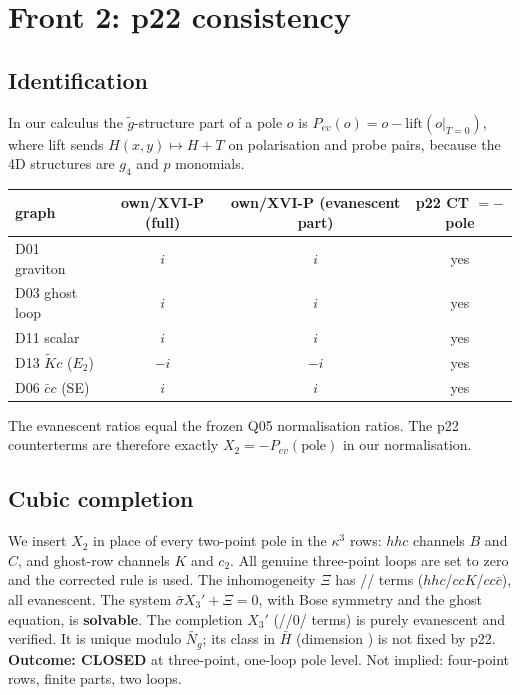 \documentclass[11pt]{article}
\begin{document}
\section{Front 2: p22 consistency}
\subsection{Identification}
In our calculus the $\tilde g$-structure part of a pole $o$ is $P_{ev}(o)=o-\mathrm{lift}(o|_{T=0})$, where lift sends
$H(x,y)\mapsto H+T$ on polarisation and probe pairs, because the 4D structures are $g_4$ and $p$ monomials.
\begin{center}\begin{tabular}{lccc}\toprule
graph & own/XVI-P (full) & own/XVI-P (evanescent part) & p22 CT $=-$pole\\\midrule
D01 graviton & $i$ & $i$ & yes\\
D03 ghost loop & $i$ & $i$ & yes\\
D11 scalar & $i$ & $i$ & yes\\
D13 $\tilde K c$ ($E_2$) & $-i$ & $-i$ & yes\\
D06 $\bar cc$ (SE) & $i$ & $i$ & yes\\\bottomrule\end{tabular}\end{center}
The evanescent ratios equal the frozen Q05 normalisation ratios. The p22 counterterms are therefore exactly
$X_2=-P_{ev}(\text{pole})$ in our normalisation.

\subsection{Cubic completion}
We insert $X_2$ in place of every two-point pole in the $\kappa^3$ rows: $hhc$ channels $B$ and $C$, and ghost-row
channels $K$ and $c_2$. All genuine three-point loops are set to zero and the corrected rule is used. The inhomogeneity
$\Xi$ has \XIh/\XIk/\XIb{} terms ($hhc$/$ccK$/$cc\bar c$), all evanescent. The system $\bar\sigma X_3'+\Xi=0$, with
Bose symmetry and the ghost equation, is \textbf{solvable}. The completion $X_3'$ (\PKa/\PCa/0/\PHa{} terms) is purely
evanescent and verified. It is unique modulo $\bar N_g$; its class in $\bar H$ (dimension \HB) is not fixed by p22.
\textbf{Outcome: CLOSED} at three-point, one-loop pole level. Not implied: four-point rows, finite parts, two loops.
\end{document}
